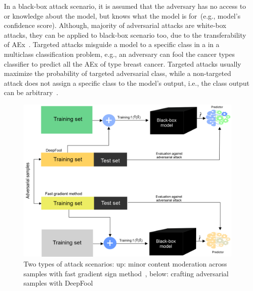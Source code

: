 \hspace*{3.5mm} In a black-box attack scenario, it is assumed that the adversary has no access to or knowledge about the model, but knows what the model is for~(e.g., model's confidence score). Although, majority of adversarial attacks are white-box attacks, they can be applied to black-box scenario too, due to the transferability of AEx~\cite{papernot2016transferability}. Targeted attacks misguide a model to a specific class in a in a multiclass classification problem, e.g., an adversary can fool the cancer types classifier to predict all the AEx of type breast cancer. Targeted attacks usually maximize the probability of targeted adversarial class, while a non-targeted attack does not assign a specific class to the model's output, i.e., the class output can be arbitrary~\cite{yuan2019adversarial}.  %

\begin{figure}[htp!]
    \centering
    \includegraphics[scale=0.55]{images/aattacks.png}
    \caption[Formulating adversarial threat model]{Two types of attack scenarios: up: minor content moderation across samples with fast gradient sign method~\cite{goodfellow2014explaining}, below: crafting adversarial samples with DeepFool}
    \label{fig:aattacks}
    \vspace{-2mm}
\end{figure}

